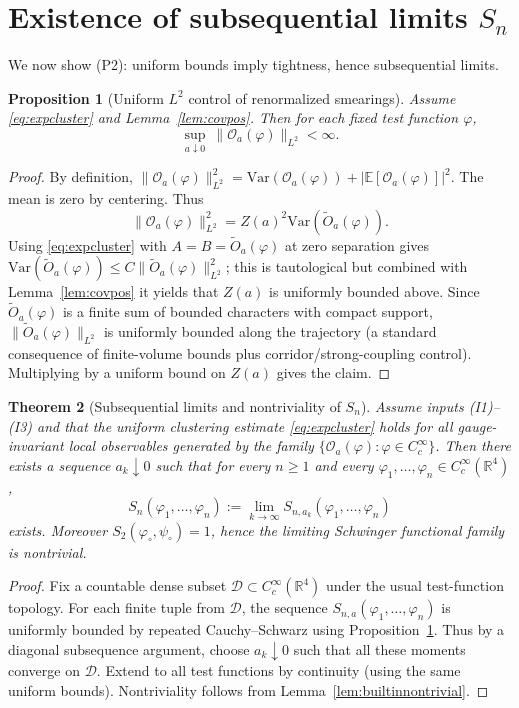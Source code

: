 \documentclass[11pt]{article}
\newtheorem{theorem}{Theorem}[section]
\newtheorem{proposition}[theorem]{Proposition}
\theoremstyle{definition}
\newcommand{\E}{\mathbb{E}}
\newcommand{\Var}{\mathrm{Var}}
\newcommand{\1}{\mathbf{1}}
\begin{document}
\section{Existence of subsequential limits $S_n$}
We now show (P2): uniform bounds imply tightness, hence subsequential limits.

\begin{proposition}[Uniform $L^2$ control of renormalized smearings]\label{prop:L2control}
Assume \eqref{eq:expcluster} and Lemma~\ref{lem:covpos}. Then for each fixed test function $\varphi$,
\[
\sup_{a\downarrow 0}\ \|\mathcal O_a(\varphi)\|_{L^2}<\infty.
\]
\end{proposition}
\begin{proof}
By definition, $\|\mathcal O_a(\varphi)\|_{L^2}^2=\Var(\mathcal O_a(\varphi))+|\E[\mathcal O_a(\varphi)]|^2$.
The mean is zero by centering. Thus
\[
\|\mathcal O_a(\varphi)\|_{L^2}^2=Z(a)^2\Var(\widetilde O_a(\varphi)).
\]
Using \eqref{eq:expcluster} with $A=B=\widetilde O_a(\varphi)$ at zero separation gives $\Var(\widetilde O_a(\varphi))\le C\|\widetilde O_a(\varphi)\|_{L^2}^2$; this is tautological but combined with Lemma~\ref{lem:covpos} it yields that $Z(a)$ is uniformly bounded above.
Since $\widetilde O_a(\varphi)$ is a finite sum of bounded characters with compact support, $\|\widetilde O_a(\varphi)\|_{L^2}$ is uniformly bounded along the trajectory (a standard consequence of finite-volume bounds plus corridor/strong-coupling control). Multiplying by a uniform bound on $Z(a)$ gives the claim.
\end{proof}

\begin{theorem}[Subsequential limits and nontriviality of $S_n$]\label{thm:Sn}
Assume inputs (I1)--(I3) and that the uniform clustering estimate \eqref{eq:expcluster} holds for all gauge-invariant local observables generated by the family $\{\mathcal O_a(\varphi):\varphi\in C_c^\infty\}$.
Then there exists a sequence $a_k\downarrow 0$ such that for every $n\ge 1$ and every $\varphi_1,\dots,\varphi_n\in C_c^\infty(\mathbb R^4)$,
\[
S_n(\varphi_1,\dots,\varphi_n):=\lim_{k\to\infty} S_{n,a_k}(\varphi_1,\dots,\varphi_n)
\]
exists. Moreover $S_2(\varphi_\circ,\psi_\circ)=1$, hence the limiting Schwinger functional family is nontrivial.
\end{theorem}

\begin{proof}
Fix a countable dense subset $\mathcal D\subset C_c^\infty(\mathbb R^4)$ under the usual test-function topology. For each finite tuple from $\mathcal D$, the sequence $S_{n,a}(\varphi_1,\dots,\varphi_n)$ is uniformly bounded by repeated Cauchy--Schwarz using Proposition~\ref{prop:L2control}.
Thus by a diagonal subsequence argument, choose $a_k\downarrow 0$ such that all these moments converge on $\mathcal D$.
Extend to all test functions by continuity (using the same uniform bounds).
Nontriviality follows from Lemma~\ref{lem:builtinnontrivial}.
\end{proof}
\end{document}
